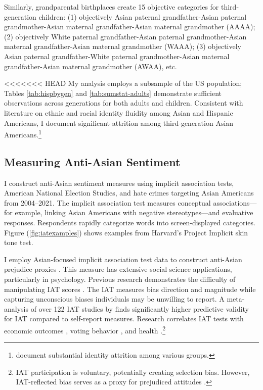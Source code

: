 Similarly, grandparental birthplaces create 15 objective categories for third-generation children: (1) objectively Asian paternal grandfather-Asian paternal grandmother-Asian maternal grandfather-Asian maternal grandmother (AAAA); (2) objectively White paternal grandfather-Asian paternal grandmother-Asian maternal grandfather-Asian maternal grandmother (WAAA); (3) objectively Asian paternal grandfather-White paternal grandmother-Asian maternal grandfather-Asian maternal grandmother (AWAA), etc.

<<<<<<< HEAD
My analysis employs a subsample of the US population; Tables \ref{tab:hispbygen} and \ref{tab:sumstat-adults} demonstrate sufficient observations across generations for both adults and children. Consistent with literature on ethnic and racial identity fluidity among Asian and Hispanic Americans, I document significant attrition among third-generation Asian Americans.\footnote{\textcite{duncanIdentifyingLaterGenerationDescendants2018,duncanSocioeconomicIntegrationImmigrant2018, antmanEthnicAttritionObserved2016,antmanEthnicAttritionAssimilation2020} document substantial identity attrition among various groups.}

\subsection{Measuring Anti-Asian Sentiment}\label{sub:lw-bias}

I construct anti-Asian sentiment measures using implicit association tests, American National Election Studies, and hate crimes targeting Asian Americans from 2004--2021. The implicit association test measures conceptual associations---for example, linking Asian Americans with negative stereotypes---and evaluative responses. Respondents rapidly categorize words into screen-displayed categories. Figure (\ref{fig:iatexamples}) shows examples from Harvard's Project Implicit skin tone test.

I employ Asian-focused implicit association test data to construct anti-Asian prejudice proxies \autocite{greenwaldMeasuringIndividualDifferences1998}. This measure has extensive social science applications, particularly in psychology. Previous research demonstrates the difficulty of manipulating IAT scores \autocite{egloffPredictiveValidityImplicit2002}. The IAT measures bias direction and magnitude while capturing unconscious biases individuals may be unwilling to report. A meta-analysis of over 122 IAT studies by \textcite{greenwaldMeasuringIndividualDifferences1998} finds significantly higher predictive validity for IAT compared to self-report measures. Research correlates IAT tests with economic outcomes \autocite{chettyRaceEconomicOpportunity2020,gloverDiscriminationSelfFulfillingProphecy2017}, voting behavior \autocite{friesePredictingVotingBehavior2007}, and health \autocite{leitnerRacialBiasAssociated2016}.\footnote{IAT participation is voluntary, potentially creating selection bias. However, IAT-reflected bias serves as a proxy for prejudiced attitudes \autocite{chettyRaceEconomicOpportunity2020}.} 

